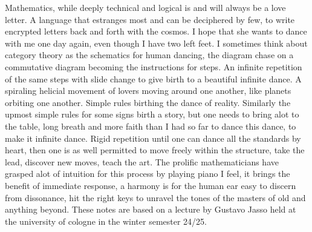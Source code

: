 Mathematics, while deeply technical and logical is and will always be a love letter. 
A language that estranges most and can be deciphered by few, to write encrypted letters back and forth with the cosmos.
I hope that she wants to dance with me one day again, even though I have two left feet.
I sometimes think about category theory as the schematics for human dancing, the diagram chase on a commutative diagram becoming the instructions for steps. 
An infinite repetition of the same steps with slide change to give birth to a beautiful infinite dance. 
A spiraling helicial movement of lovers moving around one another, like planets orbiting one another.
Simple rules birthing the dance of reality. 
Similarly the upmost simple rules for some signs birth a story, but one needs to bring alot to the table, long breath and more faith than I had so far to dance this dance, to make it infinite dance. 
Rigid repetition until one can dance all the standards by heart, then one is as well permitted to move freely within the structure, take the lead, discover new moves, teach the art.
The prolific mathematicians have grasped alot of intuition for this process by playing piano I feel, it brings the benefit of immediate response, a harmony is for the human ear easy to discern from dissonance, hit the right keys to unravel the tones of the masters of old and anything beyond. 
These notes are based on a lecture by Gustavo Jasso held at the university of cologne in the winter semester 24/25.
